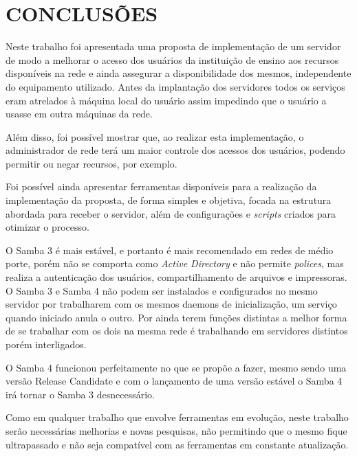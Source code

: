 \chapter{CONCLUSÕES}

Neste trabalho foi apresentada uma proposta de implementação de um servidor de modo a melhorar o acesso dos usuários da instituição de ensino aos recursos disponíveis na rede e ainda assegurar a disponibilidade dos mesmos, independente do equipamento utilizado. Antes da implantação dos servidores todos os serviços eram atrelados à máquina local do usuário assim impedindo que o usuário a usasse em outra máquinas da rede.

Além disso, foi possível mostrar que, ao realizar esta implementação, o administrador de rede terá um maior controle dos acessos dos usuários, podendo permitir ou negar recursos, por exemplo.

Foi possível ainda apresentar ferramentas disponíveis para a realização da implementação da proposta, de forma simples e objetiva, focada na estrutura abordada para receber o servidor, além de configurações e \textit{scripts} criados para otimizar o processo.

O Samba 3 é mais estável, e portanto é mais recomendado em redes de médio porte, porém não se comporta como \textit{Active Directory} e não permite \textit{polices}, mas realiza a autenticação dos usuários, compartilhamento de arquivos e impressoras.
O Samba 3 e Samba 4 não podem ser instalados e configurados no mesmo servidor por trabalharem com os mesmos daemons de inicialização, um serviço quando iniciado anula o outro.	
Por ainda terem funções distintas a melhor forma de se trabalhar com os dois na mesma rede é trabalhando em servidores distintos porém interligados.

O Samba 4 funcionou perfeitamente no que se propõe a fazer, mesmo sendo uma versão Release Candidate e com o lançamento de uma versão estável o Samba 4 irá tornar o Samba 3 desnecessário.

Como em qualquer trabalho que envolve ferramentas em evolução, neste trabalho serão necessárias melhorias e novas pesquisas, não permitindo que o mesmo fique ultrapassado e não seja compatível com as ferramentas em constante atualização.




